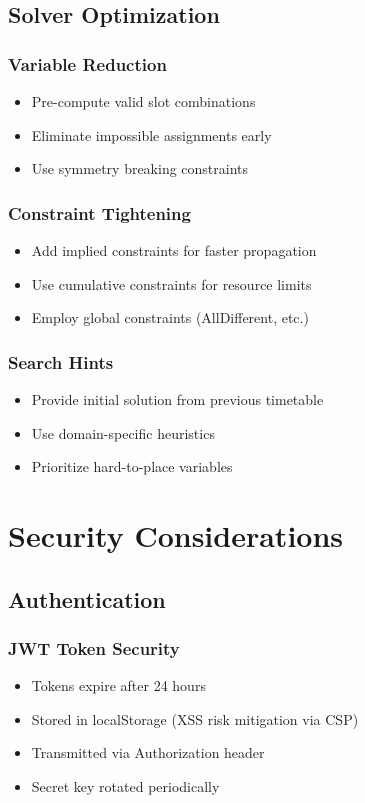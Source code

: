 \documentclass[12pt,a4paper]{article}
\begin{document}
\subsection{Solver Optimization}

\subsubsection{Variable Reduction}
\begin{itemize}
    \item Pre-compute valid slot combinations
    \item Eliminate impossible assignments early
    \item Use symmetry breaking constraints
\end{itemize}

\subsubsection{Constraint Tightening}
\begin{itemize}
    \item Add implied constraints for faster propagation
    \item Use cumulative constraints for resource limits
    \item Employ global constraints (AllDifferent, etc.)
\end{itemize}

\subsubsection{Search Hints}
\begin{itemize}
    \item Provide initial solution from previous timetable
    \item Use domain-specific heuristics
    \item Prioritize hard-to-place variables
\end{itemize}

\section{Security Considerations}

\subsection{Authentication}

\subsubsection{JWT Token Security}
\begin{itemize}
    \item Tokens expire after 24 hours
    \item Stored in localStorage (XSS risk mitigation via CSP)
    \item Transmitted via Authorization header
    \item Secret key rotated periodically
\end{itemize}
\end{document}
